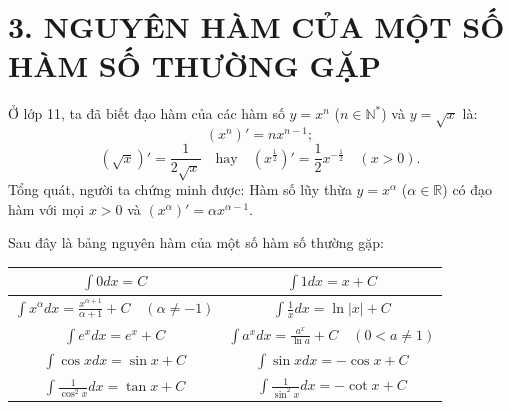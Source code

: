 \documentclass[12pt,a4paper]{extarticle}
\begin{document}
\vspace{2.5em}

\section*{\color{blue!80!black}3. NGUYÊN HÀM CỦA MỘT SỐ HÀM SỐ THƯỜNG GẶP}

\noindent Ở lớp 11, ta đã biết đạo hàm của các hàm số $y = x^n$ ($n \in \mathbb{N}^*$) và $y = \sqrt{x}$ là:
\[
(x^n)' = nx^{n-1};
\]
\[
(\sqrt{x})' = \frac{1}{2\sqrt{x}} \quad \text{hay} \quad \left(x^{\frac{1}{2}}\right)' = \frac{1}{2}x^{-\frac{1}{2}} \quad (x > 0).
\]
\noindent Tổng quát, người ta chứng minh được: Hàm số lũy thừa $y = x^\alpha$ ($\alpha \in \mathbb{R}$) có đạo hàm với mọi $x > 0$ và $(x^\alpha)' = \alpha x^{\alpha-1}$.

\vspace{1.5em}
\noindent Sau đây là bảng nguyên hàm của một số hàm số thường gặp:

\begin{center}
    \renewcommand{\arraystretch}{2.2}
    \begin{tabular}{|c|c|}
        \hline
        $\displaystyle \int 0dx = C$ & $\displaystyle \int 1dx = x + C$ \\
        \hline
        $\displaystyle \int x^\alpha dx = \frac{x^{\alpha+1}}{\alpha + 1} + C \quad (\alpha \neq -1)$ & $\displaystyle \int \frac{1}{x}dx = \ln|x| + C$ \\
        \hline
        $\displaystyle \int e^x dx = e^x + C$ & $\displaystyle \int a^x dx = \frac{a^x}{\ln a} + C \quad (0 < a \neq 1)$ \\
        \hline
        $\displaystyle \int \cos x dx = \sin x + C$ & $\displaystyle \int \sin x dx = -\cos x + C$ \\
        \hline
        $\displaystyle \int \frac{1}{\cos^2 x}dx = \tan x + C$ & $\displaystyle \int \frac{1}{\sin^2 x}dx = -\cot x + C$ \\
        \hline
    \end{tabular}
\end{center}
\end{document}

